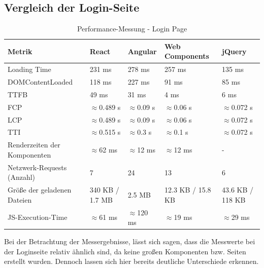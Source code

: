 \documentclass[oneside]{ausarbeitung}
\begin{document}
\subsection{Vergleich der Login-Seite}

\begin{table}[H]
\centering
\caption{Performance-Messung - Login Page}
\begin{tabular}{|p{3.5cm}|p{2.5cm}|p{2.5cm}|p{2.5cm}|p{2.5cm}|}
\hline
\textbf{Metrik}                  & \textbf{React} & \textbf{Angular} & \textbf{Web Components} & \textbf{jQuery} \\ \hline
Loading Time                     & 231 ms        & 278 ms           & 257 ms                 & 135 ms          \\ \hline
DOMContentLoaded                 & 118 ms        & 227 ms           & 91 ms                  & 85 ms           \\ \hline
TTFB                             & 49 ms        & 31 ms            & 4 ms                   & 6 ms            \\ \hline
FCP                              & $\approx$0.489 s & $\approx$0.09 s & $\approx$0.06 s        & $\approx$0.072 s \\ \hline
LCP                              & $\approx$0.489 s & $\approx$0.09 s & $\approx$0.06 s        & $\approx$0.072 s \\ \hline
TTI                              & $\approx$0.515 s & $\approx$0.3 s & $\approx$0.1 s         & $\approx$0.072 s \\ \hline
Renderzeiten der Komponenten     & $\approx$62 ms & $\approx$12 ms   & $\approx$12 ms         & - \\ \hline
Netzwerk-Requests (Anzahl)       & 7              & 24               & 13                    & 6               \\ \hline
Größe der geladenen Dateien      & 340 KB / 1.7 MB & 2.5 MB          & 12.3 KB / 15.8 KB     & 43.6 KB / 118 KB \\ \hline
JS-Execution-Time                & $\approx$61 ms       & $\approx$120 ms          & $\approx$19 ms                 & $\approx$29 ms         \\ \hline
\end{tabular}
\end{table}

Bei der Betrachtung der Messergebnisse, lässt sich sagen, dass die Messwerte bei der Loginseite relativ ähnlich sind, da keine großen Komponenten bzw. Seiten erstellt wurden. Dennoch lassen sich hier bereits deutliche Unterschiede erkennen.
\end{document}
